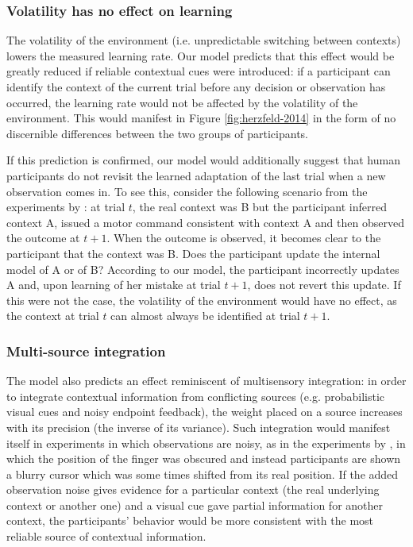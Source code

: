 \documentclass[a4paper,doc,floatsintext,natbib]{apa6}
\def \fref #1{Figure \ref{#1}}     %
\begin{document}
\subsubsection{Volatility has no effect on learning}
The volatility of the environment (i.e. unpredictable switching between contexts) lowers the measured learning rate. Our model predicts that this effect would be greatly reduced if reliable contextual cues were introduced: if a participant can identify the context of the current trial before any decision or observation has occurred, the learning rate would not be affected by the volatility of the environment. This would manifest in \fref{fig:herzfeld-2014} in the form of no discernible differences between the two groups of participants.

If this prediction is confirmed, our model would additionally suggest that human participants do not revisit the learned adaptation of the last trial when a new observation comes in. To see this, consider the following scenario from the experiments by \cite{Herzfeld_memory_2014}: at trial $t$, the real context was B but the participant inferred context A, issued a motor command consistent with context A and then observed the outcome at $t + 1$. When the outcome is observed, it becomes clear to the participant that the context was B. Does the participant update the internal model of A or of B? According to our model, the participant incorrectly updates A and, upon learning of her mistake at trial $t+1$, does not revert this update. If this were not the case, the volatility of the environment would have no effect, as the context at trial $t$ can almost always be identified at trial $t+1$.

\subsubsection{Multi-source integration}
The model also predicts an effect reminiscent of multisensory integration: in order to integrate contextual information from conflicting sources (e.g. probabilistic visual cues and noisy endpoint feedback), the weight placed on a source increases with its precision (the inverse of its variance). Such integration would manifest itself in experiments in which observations are noisy, as in the experiments by \cite{Kording_Bayesian_2004}, in which the position of the finger was obscured and instead participants are shown a blurry cursor which was some times shifted from its real position. If the added observation noise gives evidence for a particular context (the real underlying context or another one) and a visual cue gave partial information for another context, the participants' behavior would be more consistent with the most reliable source of contextual information.
\end{document}
